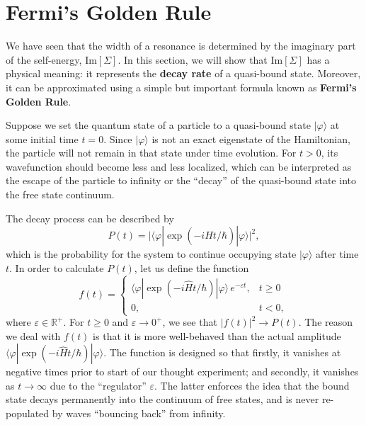 \documentclass[pra,12pt]{revtex4}
\begin{document}
\section{Fermi's Golden Rule}
\label{sec:goldenrule}

We have seen that the width of a resonance is determined by the
imaginary part of the self-energy, $\mathrm{Im}[\Sigma]$.  In this
section, we will show that $\mathrm{Im}[\Sigma]$ has a physical
meaning: it represents the \textbf{decay rate} of a quasi-bound state.
Moreover, it can be approximated using a simple but important formula
known as \textbf{Fermi's Golden Rule}.

Suppose we set the quantum state of a particle to a quasi-bound state
$|\varphi\rangle$ at some initial time $t = 0$.  Since
$|\varphi\rangle$ is not an exact eigenstate of the Hamiltonian, the
particle will not remain in that state under time evolution.  For $t >
0$, its wavefunction should become less and less localized, which can
be interpreted as the escape of the particle to infinity or the
``decay'' of the quasi-bound state into the free state continuum.

The decay process can be described by
\begin{equation}
  P(t) = \Big|\langle\varphi|\exp\left(-i\hat{H}t/\hbar\right)|\varphi\rangle\Big|^2,
\end{equation}
which is the probability for the system to continue occupying state
$|\varphi\rangle$ after time $t$.  In order to calculate $P(t)$, let
us define the function
\begin{equation}
  f(t) = \begin{cases} \langle\varphi|\exp\left(-i\hat{H}t/\hbar\right)|\varphi\rangle \,e^{-\varepsilon t}, & t \ge 0 \\ 0, & t < 0,\end{cases}
\end{equation}
where $\varepsilon \in \mathbb{R}^+$.  For $t \ge 0$ and $\varepsilon
\rightarrow 0^+$, we see that $|f(t)|^2 \rightarrow P(t)$.  The reason
we deal with $f(t)$ is that it is more well-behaved than the actual
amplitude $\langle\varphi|\exp(-i\hat{H}t/\hbar)|\varphi\rangle$.  The
function is designed so that firstly, it vanishes at negative times
prior to start of our thought experiment; and secondly, it vanishes as
$t\rightarrow\infty$ due to the ``regulator'' $\varepsilon$.  The
latter enforces the idea that the bound state decays permanently into
the continuum of free states, and is never re-populated by waves
``bouncing back'' from infinity.
\end{document}
